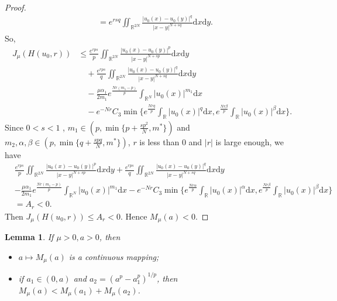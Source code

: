 \documentclass[10pt,a4paper]{amsart}
\numberwithin{equation}{section}
\newtheorem{lemma}[theorem]{Lemma}
\begin{document}
\begin{proof}
\begin{align*}
&=e^{rsq}\iint_{\mathbb{R}^{2N}}\frac{|u_0(x)-u_0(y)|^{q}}{|x-y|^{N+sq}}
 \mathrm{d}x\mathrm{d}y.
\end{align*}
So,
\begin{align*}
J_\mu(H(u_0,r))
&\le\frac{e^{rps}}{p}\iint_{\mathbb{R}^{2N}}\frac{|u_0(x)-u_0(y)|^{p}}{|x-y|^{N+sp}}
 \mathrm{d}x\mathrm{d}y\\
&\quad +\frac{e^{rps}}{q}\iint_{\mathbb{R}^{2N}}\frac{|u_0(x)-u_0(y)|^{q}}{|x-y|^{N+sq}}
 \mathrm{d}x\mathrm{d}y\\
&\quad -\frac{\mu\alpha_1}{2m_1}e^{\frac{Nr(m_1-p)}{p}}\int_{\mathbb{R}^N}|u_0(x)|^{m_1}
 \mathrm{d}x\\
&\quad -e^{-Nr}C_{3}\min\{e^{\frac{Nrq}{p}}\int_{\mathbb{R}}|u_0(x)|^{q}
 \mathrm{d}x,e^{\frac{Nr\beta}{p}}\int_{\mathbb{R}}|u_0(x)|^{\beta}\mathrm{d}x\}.
\end{align*}
Since $0<s< 1$ , $m_1\in(p,\min\{p+\frac{sp^2}{N},m^{*}\})$ and 
$m_2,\alpha,\beta\in(p,\min\{q+\frac{spq}{N},m^{*}\})$, $r $ is less than 
$0$ and $|r|$ is large enough, we have
\begin{align*}
&\frac{e^{rps}}{p}\iint_{\mathbb{R}^{2N}}\frac{|u_0(x)-u_0(y)|^{p}}{|x-y|^{N+sp}}
 \mathrm{d}x\mathrm{d}y+\frac{e^{rps}}{q}\iint_{\mathbb{R}^{2N}}
 \frac{|u_0(x)-u_0(y)|^{q}}{|x-y|^{N+sq}}\mathrm{d}x\mathrm{d}y\\
&-\frac{\mu\alpha_1}{2m_1}e^{\frac{Nr(m_1-p)}{p}}\int_{\mathbb{R}^N}|u_0(x)|^{m_1}
 \mathrm{d}x-e^{-Nr}C_{3}\min\{e^{\frac{Nr\alpha}{p}}\int_{\mathbb{R}}|u_0(x)|^{\alpha}
 \mathrm{d}x,e^{\frac{Nr\beta}{p}}\int_{\mathbb{R}}|u_0(x)|^{\beta}\mathrm{d}x\}\\
&= A_r<0.
\end{align*}
Then
$J_\mu(H(u_0,r))\le A_r<0$.
Hence $M_\mu (a)<0$.
\end{proof}

\begin{lemma}\label{lem:2.3} 
If $\mu>0,a>0$, then
\begin{itemize}
\item[(i)] $a\mapsto M_\mu (a)$ is a continuous mapping;
\item[(ii)] if $a_1\in(0,a)$ and $a_2=(a^{p}-a_1^{p})^{1/p}$,
then $M_\mu(a)<M_\mu(a_1)+M_\mu(a_2)$.
\end{itemize}
\end{lemma}
\end{document}
